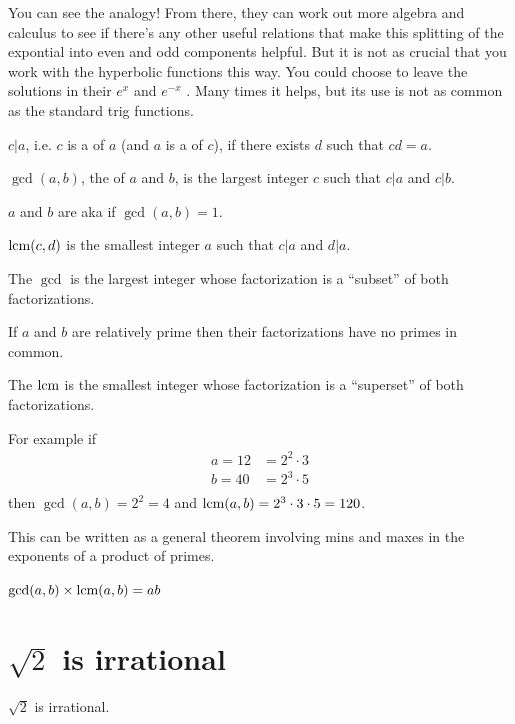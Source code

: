 You can see the analogy! From there, they can work out more algebra and calculus to see if there's
any other useful relations that make this splitting of the expontial into even and odd components
helpful. But it is not as crucial that you work with the hyperbolic functions this way. You could
choose to leave the solutions in their $e^{x}$ and $e^{-x}$ . Many times it helps, but its use is
not as common as the standard trig functions.


\begin{definition*}

 $c | a$, i.e. $c$ is a  of $a$ (and $a$ is a  of $c$), if there exists $d$ such that $cd = a$.

 $\gcd(a, b)$, the  of $a$ and $b$, is the largest integer $c$ such that $c | a$ and $c | b$.

  $a$ and $b$ are  aka  if $\gcd(a, b) = 1$.

  $\text{lcm}(c, d)$ is the smallest integer $a$ such that $c|a$ and $d|a$.
\end{definition*}

\begin{remark*}
  The $\gcd$ is the largest integer whose factorization is a ``subset​'' of both factorizations.

  If $a$ and $b$ are relatively prime then their factorizations have no primes in common.

  The $\text{lcm}$ is the smallest integer whose factorization is a ``superset​'' of both factorizations.

  For example if
  \begin{align*}
    a = 12 &= 2^2 \cdot 3 \\
    b = 40 &= 2^3 \cdot 5 \\
  \end{align*}
  then $\gcd(a, b) = 2^2 = 4$ and $\text{lcm}(a, b) = 2^3 \cdot 3 \cdot 5 = 120$.

  This can be written as a general theorem involving mins and maxes in the exponents of a product of primes.
\end{remark*}

\begin{theorem*}
  $\gcd(a,b) \times \text{lcm}(a,b) = ab$
\end{theorem*}


\section{$\sqrt{2}$ is irrational}
\begin{theorem*}
  $\sqrt{2}$ is irrational.
\end{theorem*}

